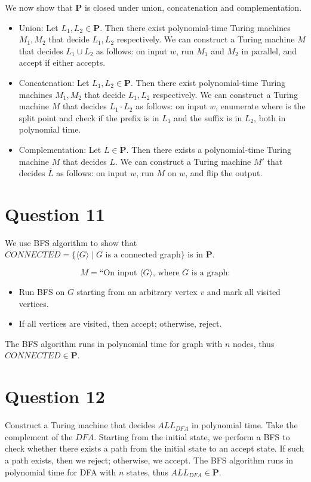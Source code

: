 \documentclass[a4paper, UTF-8]{article}
\theoremstyle{plain}
\begin{document}
We now show that $\textbf{P}$ is closed under union, concatenation and complementation.

\begin{itemize}
  \item Union: Let $L_1, L_2 \in \textbf{P}$. Then there exist polynomial-time Turing machines $M_1, M_2$ that decide $L_1, L_2$ respectively. We can construct a Turing machine $M$ that decides $L_1 \cup L_2$ as follows: on input $w$, run $M_1$ and $M_2$ in parallel, and accept if either accepts.
  \item Concatenation: Let $L_1, L_2 \in \textbf{P}$. Then there exist polynomial-time Turing machines $M_1, M_2$ that decide $L_1, L_2$ respectively. We can construct a Turing machine $M$ that decides $L_1 \cdot L_2$ as follows: on input $w$, enumerate where is the split point and check if the prefix is in $L_1$ and the suffix is in $L_2$, both in polynomial time.
  \item Complementation: Let $L \in \textbf{P}$. Then there exists a polynomial-time Turing machine $M$ that decides $L$. We can construct a Turing machine $M'$ that decides $\overline{L}$ as follows: on input $w$, run $M$ on $w$, and flip the output.
\end{itemize}

\section{Question 11} 

We use BFS algorithm to show that $CONNECTED = \{\langle G \rangle \mid G \text{ is a connected graph}\}$ is in $\textbf{P}$. 

$$
M = \text{``On input } \langle G \rangle\text{, where } G \text{ is a graph:}
$$

\begin{itemize}
  \item Run BFS on $G$ starting from an arbitrary vertex $v$ and mark all visited vertices.
  \item If all vertices are visited, then accept; otherwise, reject.
\end{itemize}

The BFS algorithm runs in polynomial time for graph with $n$ nodes, thus $CONNECTED \in \textbf{P}$.

\section{Question 12} 

Construct a Turing machine that decides $ALL_{DFA}$ in polynomial time. Take the complement of the $DFA$. Starting from the initial state, we perform a BFS to check whether there exists a path from the initial state to an accept state. If such a path exists, then we reject; otherwise, we accept. The BFS algorithm runs in polynomial time for DFA with $n$ states, thus $ALL_{DFA} \in \textbf{P}$. 
\end{document}
